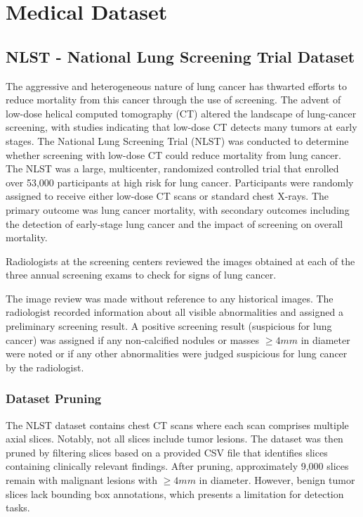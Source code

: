 \chapter{Medical Dataset}

\section{NLST - National Lung Screening Trial Dataset}
The aggressive and heterogeneous nature of lung cancer has thwarted efforts to reduce mortality from this cancer through the use of screening. 
The advent of low-dose helical computed tomography (CT) altered the landscape of lung-cancer screening, with studies indicating that low-dose CT detects many tumors at early stages.
 The National Lung Screening Trial (NLST) was conducted to determine whether screening with low-dose CT could reduce mortality from lung cancer.
The NLST was a large, multicenter, randomized controlled trial that enrolled over 53,000 participants at high risk for lung cancer. 
Participants were randomly assigned to receive either low-dose CT scans or standard chest X-rays. 
The primary outcome was lung cancer mortality, with secondary outcomes including the detection of early-stage lung cancer and the impact of screening on overall mortality.

Radiologists at the screening centers reviewed the images obtained at each of the three annual screening exams to check for signs of lung cancer.

The image review was made without reference to any historical images. The radiologist recorded information about all visible abnormalities and assigned a preliminary screening result. A positive screening result (suspicious for lung cancer) was assigned if any non-calcified nodules or masses $\geq 4 mm$ in diameter were noted or if any other abnormalities were judged suspicious for lung cancer by the radiologist.

\subsection{Dataset Pruning}
The NLST dataset contains chest CT scans where each scan comprises multiple axial slices. 
Notably, not all slices include tumor lesions. The dataset was then pruned by filtering slices based on a provided CSV file that identifies slices containing clinically relevant findings. After pruning, approximately 9,000 slices remain with malignant lesions with $\geq 4 mm$ in diameter. 
However, benign tumor slices lack bounding box annotations, which presents a limitation for detection tasks.


